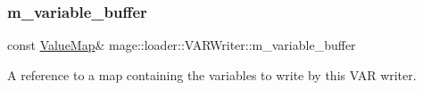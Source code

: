 \subsubsection{\texorpdfstring{m\+\_\+variable\+\_\+buffer}{m\_variable\_buffer}}
{\footnotesize\ttfamily const \mbox{\hyperlink{namespacemage_a3a4b59e486babe3ec78455f9ee0d4beb}{Value\+Map}}\& mage\+::loader\+::\+V\+A\+R\+Writer\+::m\+\_\+variable\+\_\+buffer\hspace{0.3cm}{\ttfamily [private]}}

A reference to a map containing the variables to write by this V\+AR writer. 